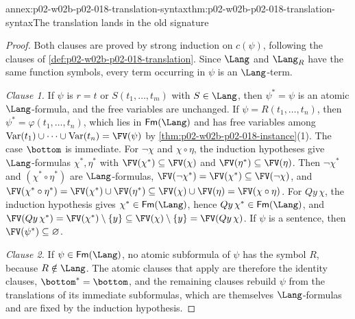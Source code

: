 \begin{annexitem}{annex:p02-w02b-p02-018-translation-syntax}{thm:p02-w02b-p02-018-translation-syntax}{The translation lands in the old signature}
\begin{proof}
Both clauses are proved by strong induction on \(c(\psi)\), following the
clauses of \cref{def:p02-w02b-p02-018-translation}.  Since \(\Lang\) and
\(\Lang_R\) have the same function symbols, every term occurring in
\(\psi\) is an \(\Lang\)-term.

\emph{Clause 1.}  If \(\psi\) is \(r=t\) or \(S(t_1,\ldots,t_m)\) with
\(S\in\Lang\), then \(\psi^{*}=\psi\) is an atomic \(\Lang\)-formula, and
the free variables are unchanged.  If \(\psi=R(t_1,\ldots,t_n)\), then
\(\psi^{*}=\varphi(t_1,\ldots,t_n)\), which lies in \(\mathsf{Fm}(\Lang)\) and
has free variables among
\(\operatorname{Var}(t_1)\cup\cdots\cup\operatorname{Var}(t_n)=\FV(\psi)\) by
\cref{thm:p02-w02b-p02-018-instance}(1).  The case \(\bottom\) is
immediate.  For \(\neg\chi\) and \(\chi\circ\eta\), the induction
hypotheses give \(\Lang\)-formulas \(\chi^{*},\eta^{*}\) with
\(\FV(\chi^{*})\subseteq\FV(\chi)\) and \(\FV(\eta^{*})\subseteq\FV(\eta)\).
Then \(\neg\chi^{*}\) and \((\chi^{*}\circ\eta^{*})\) are
\(\Lang\)-formulas, \(\FV(\neg\chi^{*})=\FV(\chi^{*})\subseteq\FV(\neg\chi)\),
and \(\FV(\chi^{*}\circ\eta^{*})=\FV(\chi^{*})\cup\FV(\eta^{*})
\subseteq\FV(\chi)\cup\FV(\eta)=\FV(\chi\circ\eta)\).
For \(Qy\,\chi\), the induction hypothesis gives
\(\chi^{*}\in\mathsf{Fm}(\Lang)\), hence \(Qy\,\chi^{*}\in\mathsf{Fm}(\Lang)\),
and \(\FV(Qy\,\chi^{*})=\FV(\chi^{*})\setminus\{y\}\subseteq
\FV(\chi)\setminus\{y\}=\FV(Qy\,\chi)\).  If \(\psi\) is a sentence, then
\(\FV(\psi^{*})\subseteq\varnothing\).

\emph{Clause 2.}  If \(\psi\in\mathsf{Fm}(\Lang)\), no atomic subformula of
\(\psi\) has the symbol \(R\), because \(R\notin\Lang\).  The atomic clauses
that apply are therefore the identity clauses, \(\bottom^{*}=\bottom\), and
the remaining clauses rebuild \(\psi\) from the translations of its
immediate subformulas, which are themselves \(\Lang\)-formulas and are
fixed by the induction hypothesis.
\end{proof}
\end{annexitem}

